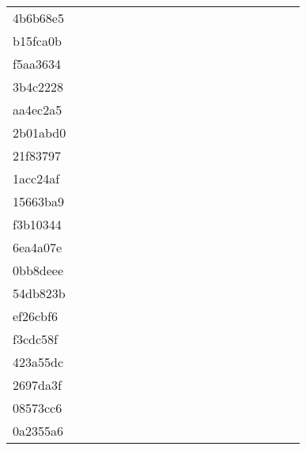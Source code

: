 \begin{table*}[htb]
\begin{tabular}{l|cccccccccccccccccc}
4b6b68e5  & \X & \X & \X & \X & \X & \X & \X & \X & \X & \X & \X & \X & \X & \X & \X & \X & \X \\
b15fca0b  & \C & \X & \X & \X & \X & \X & \X & \X & \X & \X & \X & \X & \X & \C & \C & \X & \X \\
f5aa3634  & \C & \X & \X & \X & \X & \X & \X & \X & \X & \X & \X & \X & \X & \C & \C & \C & \C \\
3b4c2228  & \C & \X & \C & \X & \X & \X & \X & \C & \C & \X & \C & \C & \C & \C & \C & \C & \C \\
aa4ec2a5  & \C & \X & \X & \X & \X & \X & \X & \X & \X & \X & \X & \X & \X & \X & \X & \C & \X \\
2b01abd0  & \C & \X & \X & \X & \X & \X & \X & \X & \C & \X & \X & \X & \X & \C & \C & \C & \X \\
21f83797  & \C & \X & \X & \X & \X & \X & \X & \C & \C & \X & \C & \C & \C & \C & \C & \C & \C \\
1acc24af  & \X & \X & \X & \X & \X & \X & \X & \X & \X & \X & \X & \X & \X & \X & \X & \X & \X \\
15663ba9  & \C & \X & \X & \X & \X & \X & \X & \X & \X & \X & \X & \X & \X & \C & \C & \X & \X \\
f3b10344  & \C & \X & \X & \X & \X & \X & \X & \X & \X & \X & \X & \X & \X & \X & \X & \C & \C \\
6ea4a07e  & \C & \X & \C & \X & \X & \X & \X & \C & \C & \C & \C & \C & \C & \C & \C & \C & \C \\
0bb8deee  & \C & \X & \X & \X & \X & \C & \X & \X & \X & \X & \C & \X & \X & \C & \C & \C & \C \\
54db823b  & \C & \X & \X & \X & \X & \X & \X & \X & \X & \X & \C & \X & \X & \C & \C & \C & \X \\
ef26cbf6  & \C & \X & \X & \X & \X & \X & \X & \X & \X & \X & \C & \C & \C & \C & \C & \C & \C \\
f3cdc58f  & \C & \X & \X & \X & \X & \X & \X & \X & \C & \X & \C & \C & \C & \C & \C & \X & \X \\
423a55dc  & \C & \X & \C & \X & \X & \X & \X & \X & \X & \X & \X & \X & \C & \C & \C & \C & \C \\
2697da3f  & \C & \X & \X & \X & \X & \X & \X & \X & \X & \X & \X & \X & \X & \C & \C & \X & \X \\
08573cc6  & \C & \X & \X & \X & \X & \X & \X & \X & \X & \X & \X & \X & \X & \X & \C & \X & \X \\
0a2355a6  & \C & \X & \X & \X & \X & \X & \X & \X & \X & \X & \X & \X & \X & \X & \C & \X & \X \\

\end{tabular}
\end{table*}

